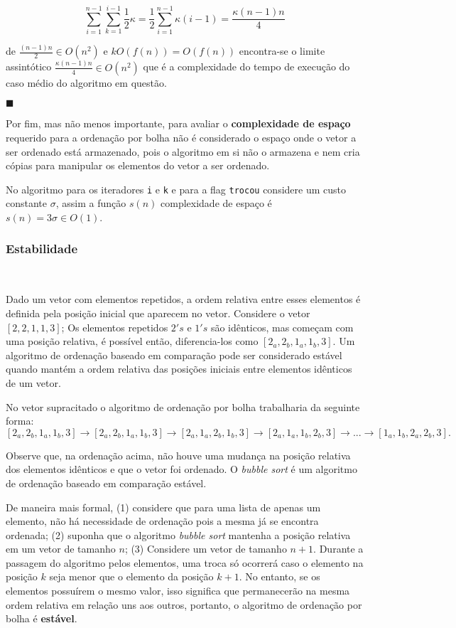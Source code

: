 \[\sum_{i=1}^{n-1}\sum_{k=1}^{i-1}\frac{1}{2}\kappa = \frac{1}{2}\sum_{i=1}^{n-1}\kappa(i-1) =  \frac{\kappa (n-1)n}{4}\]

de $\frac{(n-1)n}{2} \in O(n^2)$ e $kO(f(n))=O(f(n))$ encontra-se o limite assintótico $\frac{\kappa(n-1)n}{4} \in O(n^2)$ que é a complexidade do tempo de execução do caso médio do algoritmo em questão.

{\raggedleft $\blacksquare $ \par}

Por fim, mas não menos importante, para avaliar o \textbf{complexidade de espaço} requerido para a ordenação por bolha não é considerado o espaço onde o vetor a ser ordenado está armazenado, pois o algoritmo em si não o armazena e nem cria cópias para manipular os elementos do vetor a ser ordenado.

No algoritmo para os iteradores \texttt{i} e \texttt{k}  e para a flag \texttt{trocou} considere um custo constante $\sigma$, assim a função $s(n)$ complexidade de espaço é $s(n) = 3\sigma \in O(1)$.

\subsubsection{Estabilidade}
\

Dado um vetor com elementos repetidos, a ordem relativa entre esses elementos é definida pela posição inicial que aparecem no vetor. Considere o vetor $[2,2,1,1,3]$; Os elementos repetidos $2's$ e $1's$ são idênticos, mas começam com uma posição relativa, é possível então, diferencia-los como $[2_a, 2_b, 1_a, 1_b, 3]$. Um algoritmo de ordenação baseado em comparação pode ser considerado estável quando mantém a ordem relativa das posições iniciais entre elementos idênticos de um vetor.

No vetor supracitado o algoritmo de ordenação por bolha trabalharia da seguinte forma:
\[[2_a,2_b,1_a,1_b,3]\rightarrow[2_a,2_b,1_a,1_b,3]\rightarrow[2_a,1_a,2_b,1_b,3]\rightarrow[2_a,1_a,1_b,2_b,3]\rightarrow ... \rightarrow[1_a,1_b,2_a,2_b,3].\]

Observe que, na ordenação acima, não houve uma mudança na posição relativa dos elementos idênticos e que o vetor foi ordenado. O \textit{bubble sort} é um algoritmo de ordenação baseado em comparação estável.

De maneira mais formal, (1) considere que para uma lista de apenas um elemento, não há necessidade de ordenação pois a mesma já se encontra ordenada; (2) suponha que o algoritmo \textit{bubble sort} mantenha a posição relativa em um vetor de tamanho $n$; (3) Considere um vetor de tamanho $n+1$. Durante a passagem do algoritmo pelos elementos, uma troca só ocorrerá caso o elemento na posição $k$ seja menor que o elemento da posição $k+1$. No entanto, se os elementos possuírem o mesmo valor, isso significa que permanecerão na mesma ordem relativa em relação uns aos outros, portanto, o algoritmo de ordenação por bolha é \textbf{estável}.

